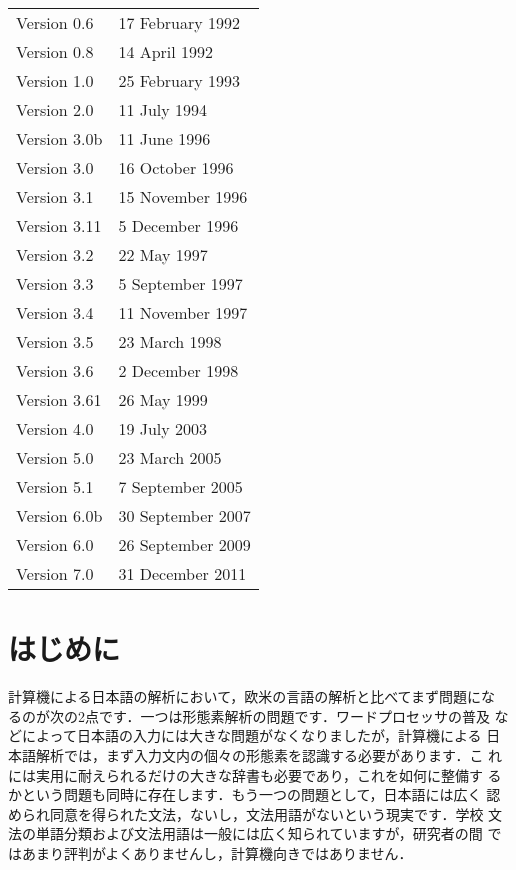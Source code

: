 \documentclass[a4j,titlepage]{jarticle}
\begin{document}
\begin{small}
\begin{tabular}{ll}
Version 0.6 & 17 February 1992 \\
Version 0.8 & 14 April 1992 \\
Version 1.0 & 25 February 1993 \\
Version 2.0 & 11 July 1994 \\
Version 3.0b & 11 June 1996 \\
Version 3.0 & 16 October 1996 \\
Version 3.1 & 15 November 1996 \\
Version 3.11 & 5 December 1996 \\
Version 3.2 & 22 May 1997 \\
Version 3.3 & 5 September 1997 \\
Version 3.4 & 11 November 1997 \\
Version 3.5 & 23 March 1998 \\
Version 3.6 & 2 December 1998 \\
Version 3.61 & 26 May 1999 \\
Version 4.0 & 19 July 2003 \\
Version 5.0 & 23 March 2005 \\
Version 5.1 & 7 September 2005 \\
Version 6.0b & 30 September 2007 \\
Version 6.0 & 26 September 2009 \\
Version 7.0 & 31 December 2011 \\
\end{tabular}
\end{small}

\clearpage

\tableofcontents

\clearpage
{}

\section{はじめに}

計算機による日本語の解析において，欧米の言語の解析と比べてまず問題にな
るのが次の2点です．一つは形態素解析の問題です．ワードプロセッサの普及
などによって日本語の入力には大きな問題がなくなりましたが，計算機による
日本語解析では，まず入力文内の個々の形態素を認識する必要があります．こ
れには実用に耐えられるだけの大きな辞書も必要であり，これを如何に整備す
るかという問題も同時に存在します．もう一つの問題として，日本語には広く
認められ同意を得られた文法，ないし，文法用語がないという現実です．学校
文法の単語分類および文法用語は一般には広く知られていますが，研究者の間
ではあまり評判がよくありませんし，計算機向きではありません．
\end{document}
